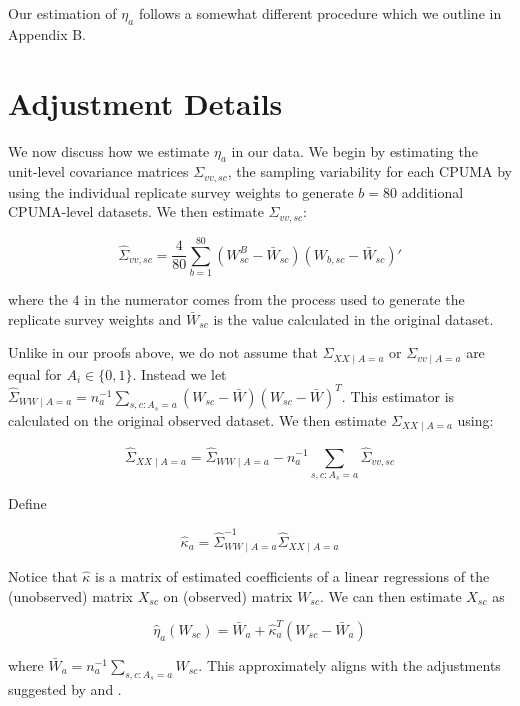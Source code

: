 Our estimation of $\eta_a$ follows a somewhat different procedure which we outline in Appendix B.

\section{Adjustment Details}

We now discuss how we estimate $\eta_a$ in our data. We begin by estimating the unit-level covariance matrices $\Sigma_{vv, sc}$, the sampling variability for each CPUMA by using the individual replicate survey weights to generate $b = 80$ additional CPUMA-level datasets. We then estimate $\Sigma_{vv, sc}$:

\begin{equation}
\hat{\Sigma}_{vv, sc} = \frac{4}{80}\sum_{b=1}^{80}(W_{sc}^B - \bar{W}_{sc})(W_{b, sc} - \bar{W}_{sc})'
\end{equation}

where the $4$ in the numerator comes from the process used to generate the replicate survey weights and $\bar{W}_{sc}$ is the value calculated in the original dataset. 

Unlike in our proofs above, we do not assume that $\Sigma_{XX \mid A = a}$ or $\Sigma_{vv \mid A = a}$ are equal for $A_i \in \{0, 1\}$. Instead we let $\hat{\Sigma}_{WW \mid A = a} = n_a^{-1}\sum_{s, c: A_s = a} (W_{sc} - \bar{W})(W_{sc} - \bar{W})^T$. This estimator is calculated on the original observed dataset. We then estimate $\Sigma_{XX \mid A = a}$ using:

\begin{equation}
\hat{\Sigma}_{XX \mid A = a} = \hat{\Sigma}_{WW \mid A = a} - n_a^{-1}\sum_{s, c: A_s = a} \hat{\Sigma}_{vv, sc}
\end{equation}

Define

\begin{equation}
\hat{\kappa}_a = \hat{\Sigma}_{WW \mid A = a}^{-1}\hat{\Sigma}_{XX \mid A = a}
\end{equation}

Notice that $\hat{\kappa}$ is a matrix of estimated coefficients of a linear regressions of the (unobserved) matrix $X_{sc}$ on (observed) matrix $W_{sc}$. We can then estimate $X_{sc}$ as

\begin{equation}
\hat{\eta}_a(W_{sc}) = \bar{W}_a + \hat{\kappa}_a^T(W_{sc} - \bar{W}_a)
\end{equation}

where $\bar{W}_a = n_a^{-1}\sum_{s, c: A_s = a} W_{sc}$. This approximately aligns with the adjustments suggested by \cite{carroll2006measurement} and \cite{gleser1992importance}. 


